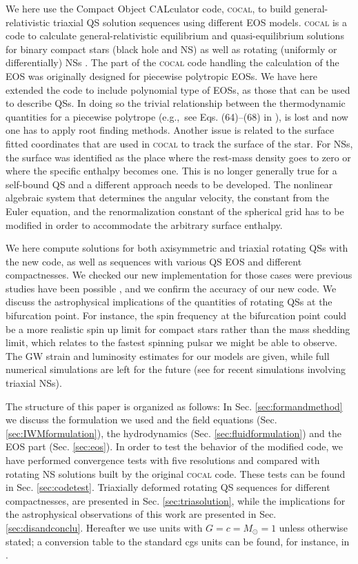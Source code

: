 \documentclass[twocolumn,superscriptaddress,showpacs,prd,aps,amsmath,amssymb,nofootinbib]{revtex4-1}
\newcommand{\cocal}{\textsc{cocal}}
\newcommand{\eg}{e.g.,~}
\begin{document}
We here use the Compact Object CALculator code, \cocal{}, to build
general-relativistic triaxial QS solution sequences using different EOS
models. \cocal{} is a code to calculate general-relativistic equilibrium
and quasi-equilibrium solutions for binary compact stars (black hole and
NS) as well as rotating (uniformly or differentially)
NSs \cite{Uryu2012,Uryu:2012b,Tsokaros2012,Tsokaros2015,
  Huang08,Uryu2016a}.  The part of the \cocal{} code handling the
calculation of the EOS was originally designed for piecewise polytropic
EOSs. We have here extended the code to include polynomial type of EOSs,
as those that can be used to describe QSs. In doing so the trivial
relationship between the thermodynamic quantities for a piecewise
polytrope (\eg see Eqs.  (64)--(68) in \cite{Tsokaros2015}), is lost and
now one has to apply root finding methods. Another issue is related to
the surface fitted coordinates that are used in \cocal{} to track the
surface of the star. For NSs, the surface was identified as the place
where the rest-mass density goes to zero or where the specific enthalpy
becomes one. This is no longer generally true for a
self-bound QS and a different approach needs to be developed. The
nonlinear algebraic system that determines the angular velocity, the
constant from the Euler equation, and the renormalization constant of the
spherical grid has to be modified in order to accommodate
the arbitrary surface enthalpy.

We here compute solutions for both axisymmetric and triaxial rotating QSs
with the new code, as well as sequences with various QS EOS and different
compactnesses. We checked our new implementation for those cases were
previous studies have been possible \cite{Huang08}, and we confirm the
accuracy of our new code. We discuss the astrophysical implications of
the quantities of rotating QSs at the bifurcation point. For instance,
the spin frequency at the bifurcation point could be a more realistic
spin up limit for compact stars rather than the mass shedding limit,
which relates to the fastest spinning pulsar we might be able to
observe. The GW strain and luminosity estimates for our models are given,
while full numerical simulations are left for the future (see
\cite{Tsokaros2017} for recent simulations involving triaxial NSs).

The structure of this paper is organized as follows: In
Sec. \ref{sec:formandmethod} we discuss the formulation we used and the
field equations (Sec. \ref{sec:IWMformulation}), the hydrodynamics
(Sec. \ref{sec:fluidformulation}) and the EOS part
(Sec. \ref{sec:eos}). In order to test the behavior of the modified code,
we have performed convergence tests with five resolutions and compared
with rotating NS solutions built by the original \cocal{} code. These
tests can be found in Sec. \ref{sec:codetest}. Triaxially deformed
rotating QS sequences for different compactnesses, are presented in
Sec. \ref{sec:triasolution}, while the implications for the astrophysical
observations of this work are presented in Sec. \ref{sec:disandconclu}.
Hereafter we use units with $G=c=M_\odot=1$ unless otherwise stated; a
conversion table to the standard cgs units can be found, for instance, in
\cite{Rezzolla_book:2013}.
\end{document}
